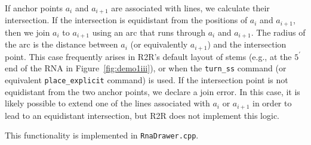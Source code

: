 \documentclass[letterpaper,12pt]{report}
\begin{document}
If anchor points $a_i$ and $a_{i+1}$ are associated with lines, we calculate their intersection.  If the intersection is equidistant from the positions of $a_i$ and $a_{i+1}$, then we join $a_i$ to $a_{i+1}$ using an arc that runs through $a_i$ and $a_{i+1}$.  The radius of the arc is the distance between $a_i$ (or equivalently $a_{i+1}$) and the intersection point.
This case frequently arises in R2R's default layout of stems (e.g., at the $5^\prime$ end of the RNA in Figure~\ref{fig:demo1iii}), or when the {\tt turn\_ss} command (or equivalent {\tt place\_explicit} command) is used.
If the intersection point is not equidistant from the two anchor points, we declare a join error.  In this case, it is likely possible to extend one of the lines associated with $a_i$ or $a_{i+1}$ in order to lead to an equidistant intersection, but R2R does not implement this logic.

This functionality is implemented in {\tt RnaDrawer.cpp}.




\end{document}
